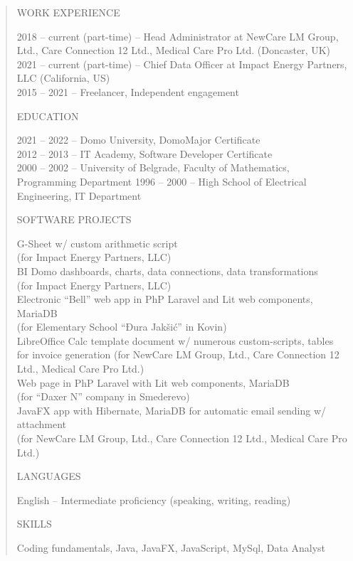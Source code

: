 \documentclass[
]{article}
\begin{document}
\begin{quote}
WORK EXPERIENCE

2018 -- current (part-time) -- Head Administrator at NewCare LM Group,
Ltd., Care Connection 12 Ltd., Medical Care Pro Ltd. (Doncaster, UK)
2021 -- current (part-time) -- Chief Data Officer at Impact Energy
Partners, LLC (California, US)\\
2015 -- 2021 -- Freelancer, Independent engagement

EDUCATION

2021 -- 2022 -- Domo University, DomoMajor Certificate\\
2012 -- 2013 -- IT Academy, Software Developer Certificate\\
2000 -- 2002 -- University of Belgrade, Faculty of Mathematics,
Programming Department 1996 -- 2000 -- High School of Electrical
Engineering, IT Department

SOFTWARE PROJECTS

G-Sheet w/ custom arithmetic script\\
(for Impact Energy Partners, LLC)\\
BI Domo dashboards, charts, data connections, data transformations\\
(for Impact Energy Partners, LLC)\\
Electronic ``Bell'' web app in PhP Laravel and Lit web components,
MariaDB\\
(for Elementary School ``Đura Jakšić'' in Kovin)\\
LibreOffice Calc template document w/ numerous custom-scripts, tables
for invoice generation (for NewCare LM Group, Ltd., Care Connection 12
Ltd., Medical Care Pro Ltd.)\\
Web page in PhP Laravel with Lit web components, MariaDB\\
(for ``Daxer N'' company in Smederevo)\\
JavaFX app with Hibernate, MariaDB for automatic email sending w/
attachment\\
(for NewCare LM Group, Ltd., Care Connection 12 Ltd., Medical Care Pro
Ltd.)

LANGUAGES

English -- Intermediate proficiency (speaking, writing, reading)

SKILLS

Coding fundamentals, Java, JavaFX, JavaScript, MySql, Data Analyst
\end{quote}
\end{document}
